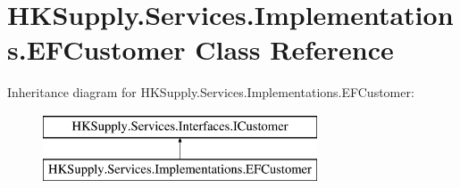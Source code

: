 \hypertarget{class_h_k_supply_1_1_services_1_1_implementations_1_1_e_f_customer}{}\section{H\+K\+Supply.\+Services.\+Implementations.\+E\+F\+Customer Class Reference}
\label{class_h_k_supply_1_1_services_1_1_implementations_1_1_e_f_customer}
Inheritance diagram for H\+K\+Supply.\+Services.\+Implementations.\+E\+F\+Customer\+:\begin{figure}[H]
\begin{center}
\leavevmode
\includegraphics[height=2.000000cm]{class_h_k_supply_1_1_services_1_1_implementations_1_1_e_f_customer}
\end{center}
\end{figure}
